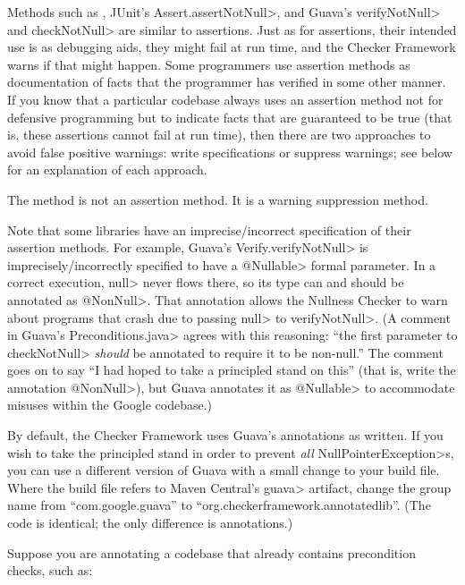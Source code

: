 \label{assertion-methods}
Methods such as
,
JUnit's \<Assert.assertNotNull>, and
Guava's \<verifyNotNull> and \<checkNotNull> are
similar to assertions.  Just as for assertions, their intended use is as
debugging aids, they might fail at run time, and the Checker Framework
warns if that might happen.
Some programmers use assertion methods as documentation of facts
that the programmer has verified in some other manner.
If you know that a particular codebase always uses
an assertion method not for defensive programming but to indicate
facts that are guaranteed to be true (that is, these assertions cannot
fail at run time), then there are two approaches to avoid false positive
warnings:  write specifications or suppress
warnings; see below for an explanation of each approach.

The method
 is not an
assertion method.  It is a warning suppression method.

Note that some libraries have an imprecise/incorrect specification of their assertion
methods.  For example, Guava's \<Verify.verifyNotNull> is imprecisely/incorrectly
specified to have a \<@Nullable> formal parameter.  In a correct execution,
\<null> never flows there, so its type can and should be annotated as
\<@NonNull>.  That annotation allows the Nullness Checker to warn about
programs that crash due to passing \<null> to \<verifyNotNull>.
(A comment in Guava's \<Preconditions.java> agrees with this reasoning:
``the first parameter to \<checkNotNull> \emph{should} be annotated to
require it to be non-null.''  The comment goes on to say ``I had hoped to
take a principled stand on this'' (that is, write the annotation
\<@NonNull>), but Guava annotates it as \<@Nullable> to accommodate misuses
within the Google codebase.)

By default, the Checker Framework uses Guava's annotations as written.  If
you wish to take the principled stand in order to prevent \emph{all}
\<NullPointerException>s, you can
use a different version of Guava with a small change to your build file.  Where the
build file refers to Maven Central's \<guava> artifact, change the group
name from ``com.google.guava'' to ``org.checkerframework.annotatedlib''.
(The code is identical; the only difference is annotations.)


Suppose you are annotating a codebase that already contains precondition checks,
such as:

